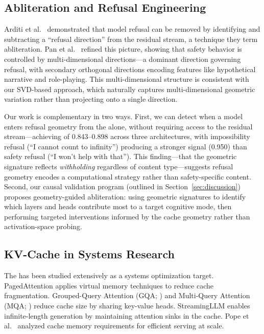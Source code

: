 \subsection{Abliteration and Refusal Engineering}

Arditi et al.\ \cite{arditi2024} demonstrated that model refusal can be removed by identifying and subtracting a ``refusal direction'' from the residual stream, a technique they term abliteration.
Pan et al.\ \cite{pan2025safety} refined this picture, showing that safety behavior is controlled by multi-dimensional directions---a dominant direction governing refusal, with secondary orthogonal directions encoding features like hypothetical narrative and role-playing.
This multi-dimensional structure is consistent with our SVD-based approach, which naturally captures multi-dimensional geometric variation rather than projecting onto a single direction.

Our work is complementary in two ways.
First, we can detect when a model enters refusal geometry from the \kvcache alone, without requiring access to the residual stream---achieving \auroc of 0.843--0.898 across three architectures, with impossibility refusal (``I cannot count to infinity'') producing a stronger signal (0.950) than safety refusal (``I won't help with that'').
This finding---that the geometric signature reflects \emph{withholding} regardless of content type---suggests refusal geometry encodes a computational strategy rather than safety-specific content.
Second, our causal validation program (outlined in Section~\ref{sec:discussion}) proposes geometry-guided abliteration: using \kvcache geometric signatures to identify which layers and heads contribute most to a target cognitive mode, then performing targeted interventions informed by the cache geometry rather than activation-space probing.

\subsection{KV-Cache in Systems Research}

The \kvcache has been studied extensively as a systems optimization target.
PagedAttention \cite{kwon2023} applies virtual memory techniques to reduce cache fragmentation.
Grouped-Query Attention (GQA; \cite{ainslie2023}) and Multi-Query Attention (MQA; \cite{shazeer2019}) reduce cache size by sharing key-value heads.
StreamingLLM \cite{xiao2024} enables infinite-length generation by maintaining attention sinks in the cache.
Pope et al.\ \cite{pope2023} analyzed cache memory requirements for efficient serving at scale.

